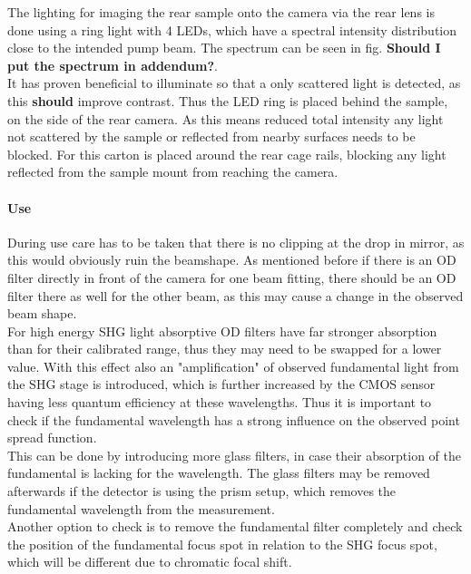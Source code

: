\documentclass[twoside,openright]{scrreprt}
\begin{document}
The lighting for imaging the rear sample onto the camera via the rear lens is done using a ring light with 4 LEDs, which have a spectral intensity distribution close to the intended pump beam. The spectrum can be seen in fig. \textbf{Should I put the spectrum in addendum?}.\\
It has proven beneficial to illuminate so that a only scattered light is detected, as this \textbf{should} improve contrast. Thus the LED ring is placed behind the sample, on the side of the rear camera. As this means reduced total intensity any light not scattered by the sample or reflected from nearby surfaces needs to be blocked. For this carton is placed around the rear cage rails, blocking any light reflected from the sample mount from reaching the camera.

\paragraph{Use}
During use care has to be taken that there is no clipping at the drop in mirror, as this would obviously ruin the beamshape. As mentioned before if there is an OD filter directly in front of the camera for one beam fitting, there should be an OD filter there as well for the other beam, as this may cause a change in the observed beam shape.\\
For high energy SHG light absorptive OD filters have far stronger absorption than for their calibrated range, thus they may need to be swapped for a lower value. With this effect also an "amplification" of observed fundamental light from the SHG stage is introduced, which is further increased by the CMOS sensor having less quantum efficiency at these wavelengths. Thus it is important to check if the fundamental wavelength has a strong influence on the observed point spread function.\\
This can be done by introducing more glass filters, in case their absorption of the fundamental is lacking for the wavelength. The glass filters may be removed afterwards if the detector is using the prism setup, which removes the fundamental wavelength from the measurement.\\
Another option to check is to remove the fundamental filter completely and check the position of the fundamental focus spot in relation to the SHG focus spot, which will be different due to chromatic focal shift.
\end{document}
